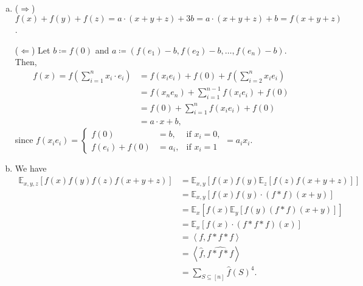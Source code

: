 \documentclass[12pt]{article}
\newcommand{\E}[2][]{\mathbb E_{#1}\left[#2\right]}
\newcommand{\sumS}{\sum_{S \subseteq [n]}}
\renewcommand{\ip}[1]{\left\langle#1\right\rangle}
\begin{document}
\subsection{}

\subsection{}

\subsection{}

\subsection{}
\begin{enumerate}[(a)]
    \item ($\Longrightarrow$) $f(x) + f(y) + f(z) = a \cdot (x + y + z) + 3b = a \cdot (x + y + z) + b = f(x+y+z)$.
    
    ($\Longleftarrow$) Let $b \coloneqq f(0)$ and $a \coloneqq (f(e_1) - b, f(e_2) - b, \ldots, f(e_n) - b)$. Then,
    \begin{align*}
    f(x) = f\left(\sum_{i = 1}^n x_i \cdot e_i\right) &= f(x_i e_i) + f(0) + f\left(\sum_{i = 2}^n x_i e_i\right)\\
    &= f(x_n e_n) + \sum_{i = 1}^{n-1} f(x_i e_i) + f(0)\\
    &= f(0) + \sum_{i = 1}^{n} f(x_i e_i) + f(0)\\
    &= a \cdot x + b,
    \end{align*}
    since $f(x_i e_i) = \left\{\begin{array}{lll}f(0) &= b, &\text{if } x_i = 0,\\f(e_i) + f(0) &= a_i, &\text{if } x_i = 1\end{array}\right. = a_i x_i$.
    
    \item We have
    \begin{align*}
        \E[x,y,z]{f(x)f(y)f(z)f(x+y+z)} &= \E[x,y]{f(x)f(y)\E[z]{f(z)f(x+y+z)}}\\
        &= \E[x,y]{f(x) f(y) \cdot (f * f)(x+y)}\\
        &= \E[x]{f(x) \E[y]{f(y) (f * f)(x+y)}}\\
        &= \E[x]{f(x) \cdot (f * f * f)(x)}\\
        &= \ip{f, f * f * f}\\
        &= \ip{\hat{f}, \widehat{f * f * f}}\\
        &= \sumS \hat{f}(S)^4.
    \end{align*}
    

\end{enumerate}
\end{document}
